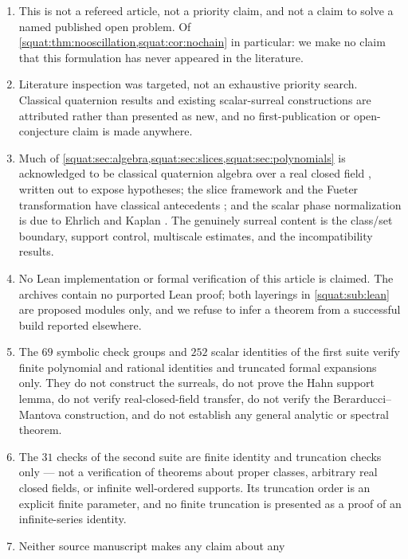\documentclass[11pt,letterpaper]{article}
\numberwithin{equation}{section}
\theoremstyle{definition}
\theoremstyle{remark}
\begin{document}
\begin{enumerate}[label=\textup{(N\arabic*)},leftmargin=3.2em]
\item\label{squat:nc:refereed} This is not a refereed article, not a priority claim, and
not a claim to solve a named published open problem. Of
\cref{squat:thm:nooscillation,squat:cor:nochain} in particular: we make no claim that this
formulation has never appeared in the literature.
\item\label{squat:nc:literature} Literature inspection was targeted, not an exhaustive
priority search. Classical quaternion results and existing scalar-surreal constructions are
attributed rather than presented as new, and no first-publication or open-conjecture claim
is made anywhere.
\item\label{squat:nc:classical} Much of
\cref{squat:sec:algebra,squat:sec:slices,squat:sec:polynomials} is acknowledged to be
classical quaternion algebra over a real closed field \cite{Voight}, written out to expose
hypotheses; the slice framework and the Fueter transformation have classical antecedents
\cite{GP}; and the scalar phase normalization is due to Ehrlich and Kaplan \cite{EK}. The
genuinely surreal content is the class/set boundary, support control, multiscale estimates,
and the incompatibility results.
\item\label{squat:nc:nolean} No Lean implementation or formal verification of this
article is claimed. The archives contain no purported Lean proof; both layerings in
\cref{squat:sub:lean} are proposed modules only, and we refuse to infer a theorem from a
successful build reported elsewhere.
\item\label{squat:nc:checks1} The $69$ symbolic check groups and $252$ scalar identities of
the first suite verify finite polynomial and rational identities and truncated formal
expansions only. They do not construct the surreals, do not prove the Hahn support lemma,
do not verify real-closed-field transfer, do not verify the Berarducci--Mantova
construction, and do not establish any general analytic or spectral theorem.
\item\label{squat:nc:checks2} The $31$ checks of the second suite are finite identity and
truncation checks only --- not a verification of theorems about proper classes, arbitrary
real closed fields, or infinite well-ordered supports. Its truncation order is an explicit
finite parameter, and no finite truncation is presented as a proof of an infinite-series
identity.
\item\label{squat:nc:nophysics} Neither source manuscript makes any claim about any

\end{enumerate}
\end{document}
